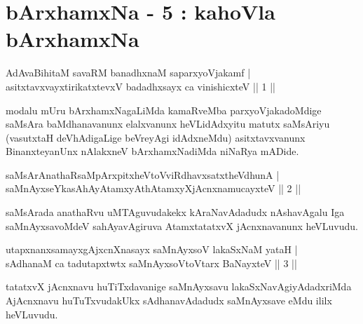


\chapter{bArxhamxNa - 5 : kahoVla bArxhamxNa}

\begin{shl}
AdAvaBihitaM savaRM banadhxnaM saparxyoVjakamf |\\
asitxtavxvayxtirikatxtevxV badadhxsayx ca vinishicxteV \hfill || 1 ||
\end{shl}

\begin{artha}%
modalu mUru bArxhamxNagaLiMda kamaRveMba parxyoVjakadoMdige saMsAra baMdhanavanunx elalxvanunx heVLidAdxyitu matutx saMsAriyu (vasutxtaH deVhAdigaLige beVreyAgi idAdxneMdu) asitxtavxvanunx BinanxteyanUnx nAlakxneV bArxhamxNadiMda niNaRya mADide.
\end{artha}


\begin{shl}
saMsArAnathaRsaMpArxpitxheVtoVviRdhavxsatxtheV\s dhunA |\\
saMnAyxseYkasAhAyAtamxyAthAtamxyXjAcnxnamucayxteV \hfill || 2 ||
\end{shl}

\begin{artha}
saMsArada anathaRvu uMTAguvudakekx kAraNavAdadudx nAshavAgalu Iga saMnAyxsavoMdeV sahAyavAgiruva AtamxtatatxvX jAcnxnavanunx heVLuvudu.
\end{artha}


\begin{shl}
utapxnanxsamayxgAjxcnXnasayx saMnAyxsoV lakaSxNaM yataH |\\
sAdhanaM ca tadutapxtwtx saMnAyxsoV\s toV\s tarx BaNayxteV \hfill || 3 ||
\end{shl}

\begin{artha}
tatatxvX jAcnxnavu huTiTxdavanige saMnAyxsavu lakaSxNavAgiyAdadxriMda AjAcnxnavu huTuTxvudakUkx sAdhanavAdadudx saMnAyxsave eMdu ililx heVLuvudu.
\end{artha}


